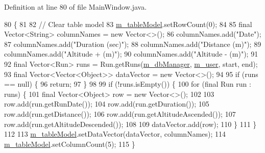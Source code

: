 Definition at line 80 of file Main\+Window.\+java.


\begin{DoxyCode}
80                                                                  \{
81 
82         \textcolor{comment}{// Clear table model}
83         \mbox{\hyperlink{classcom_1_1activitytracker_1_1_main_window_a5e90682f487d5bb840e3afada9e7ff9a}{m\_tableModel}}.setRowCount(0);
84 
85         \textcolor{keyword}{final} Vector<String> columnNames = \textcolor{keyword}{new} Vector<>();
86         columnNames.add(\textcolor{stringliteral}{"Date"});
87         columnNames.add(\textcolor{stringliteral}{"Duration (sec)"});
88         columnNames.add(\textcolor{stringliteral}{"Distance (m)"});
89         columnNames.add(\textcolor{stringliteral}{"Altitude + (m)"});
90         columnNames.add(\textcolor{stringliteral}{"Altitude - (m)"});
91 
92         \textcolor{keyword}{final} Vector<Run> runs = Run.getRuns(\mbox{\hyperlink{classcom_1_1activitytracker_1_1_main_window_ab2af51cb35794567e55564a4d3abbb79}{m\_dbManager}}, \mbox{\hyperlink{classcom_1_1activitytracker_1_1_main_window_a96e28fa47e1740a7ddc16aa48406db85}{m\_user}}, start, end);
93         \textcolor{keyword}{final} Vector<Vector<Object>> dataVector = \textcolor{keyword}{new} Vector<>();
94 
95         \textcolor{keywordflow}{if} (runs == null) \{
96             \textcolor{keywordflow}{return};
97         \}
98 
99         \textcolor{keywordflow}{if} (!runs.isEmpty()) \{
100             \textcolor{keywordflow}{for} (\textcolor{keyword}{final} Run run : runs) \{
101                 \textcolor{keyword}{final} Vector<Object> row = \textcolor{keyword}{new} Vector<>();
102 
103                 row.add(run.getRunDate());
104                 row.add(run.getDuration());
105                 row.add(run.getDistance());
106                 row.add(run.getAltitudeAscended());
107                 row.add(run.getAltitudeDescended());
108 
109                 dataVector.add(row);
110             \}
111         \}
112 
113         \mbox{\hyperlink{classcom_1_1activitytracker_1_1_main_window_a5e90682f487d5bb840e3afada9e7ff9a}{m\_tableModel}}.setDataVector(dataVector, columnNames);
114         \mbox{\hyperlink{classcom_1_1activitytracker_1_1_main_window_a5e90682f487d5bb840e3afada9e7ff9a}{m\_tableModel}}.setColumnCount(5);
115     \}
\end{DoxyCode}
\mbox{\label{classcom_1_1activitytracker_1_1_main_window_a62e9c6f477ccc5b93aff33abb567fde4}} 
